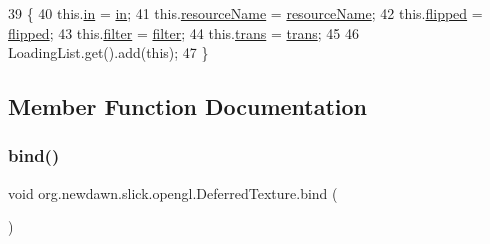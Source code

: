 \begin{DoxyCode}
39                                                                                                           \{
40         this.\mbox{\hyperlink{classorg_1_1newdawn_1_1slick_1_1opengl_1_1_deferred_texture_a489ed93637c4777d8f36d17233a77d59}{in}} = \mbox{\hyperlink{classorg_1_1newdawn_1_1slick_1_1opengl_1_1_deferred_texture_a489ed93637c4777d8f36d17233a77d59}{in}};
41         this.\mbox{\hyperlink{classorg_1_1newdawn_1_1slick_1_1opengl_1_1_deferred_texture_a883fc20f133626f8f49684adb5b65976}{resourceName}} = \mbox{\hyperlink{classorg_1_1newdawn_1_1slick_1_1opengl_1_1_deferred_texture_a883fc20f133626f8f49684adb5b65976}{resourceName}};
42         this.\mbox{\hyperlink{classorg_1_1newdawn_1_1slick_1_1opengl_1_1_deferred_texture_a1dcb7e5cee99769047c984f3fe8f7a8f}{flipped}} = \mbox{\hyperlink{classorg_1_1newdawn_1_1slick_1_1opengl_1_1_deferred_texture_a1dcb7e5cee99769047c984f3fe8f7a8f}{flipped}};
43         this.\mbox{\hyperlink{classorg_1_1newdawn_1_1slick_1_1opengl_1_1_deferred_texture_abb572d47ae7bce7204cc9c86245c9797}{filter}} = \mbox{\hyperlink{classorg_1_1newdawn_1_1slick_1_1opengl_1_1_deferred_texture_abb572d47ae7bce7204cc9c86245c9797}{filter}};
44         this.\mbox{\hyperlink{classorg_1_1newdawn_1_1slick_1_1opengl_1_1_deferred_texture_a8dc1083c72d7039e412c71e1cd75d4e6}{trans}} = \mbox{\hyperlink{classorg_1_1newdawn_1_1slick_1_1opengl_1_1_deferred_texture_a8dc1083c72d7039e412c71e1cd75d4e6}{trans}};
45         
46         LoadingList.get().add(\textcolor{keyword}{this});
47     \}
\end{DoxyCode}


\subsection{Member Function Documentation}
\mbox{\label{classorg_1_1newdawn_1_1slick_1_1opengl_1_1_deferred_texture_a5cd19d9ae09f098e85030b777e6de069}} 
\subsubsection{\texorpdfstring{bind()}{bind()}}
{\footnotesize\ttfamily void org.\+newdawn.\+slick.\+opengl.\+Deferred\+Texture.\+bind (\begin{DoxyParamCaption}{ }\end{DoxyParamCaption})\hspace{0.3cm}{\ttfamily [inline]}}

